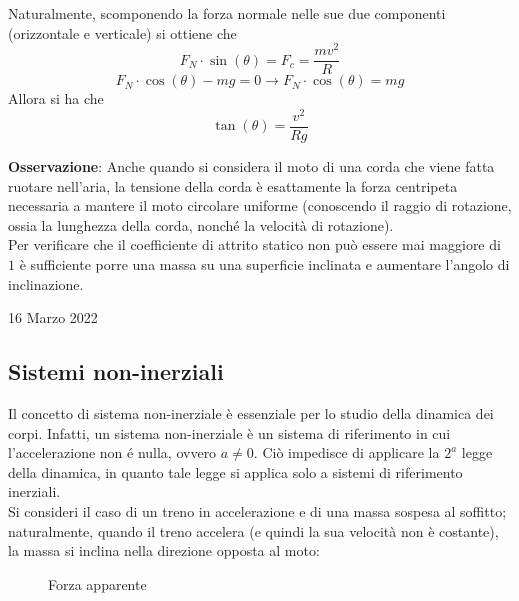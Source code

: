 \documentclass[a4paper]{extarticle}
\begin{document}
\vspace{1em}
\noindent
Naturalmente, scomponendo la forza normale nelle sue due componenti (orizzontale e verticale) si ottiene che
\[F_N \cdot \sin(\theta) = F_c = \frac{m v^2}{R}\]
\[F_N \cdot \cos(\theta) - mg = 0 \longrightarrow F_N \cdot \cos(\theta) = mg\]
Allora si ha che
\[\tan(\theta) = \frac{v^2}{R g}\]

\vspace{1em}
\noindent
\textbf{Osservazione}: Anche quando si considera il moto di una corda che viene fatta ruotare nell'aria, la tensione della corda è esattamente la forza centripeta necessaria a mantere il moto circolare uniforme (conoscendo il raggio di rotazione, ossia la lunghezza della corda, nonché la velocità di rotazione).\\
Per verificare che il coefficiente di attrito statico non può essere mai maggiore di $1$ è sufficiente porre una massa su una superficie inclinata e aumentare l'angolo di inclinazione.\\

\newpage
\noindent
\begin{center}
  16 Marzo 2022
\end{center}
\subsection{Sistemi non-inerziali}
Il concetto di sistema non-inerziale è essenziale per lo studio della dinamica dei corpi. Infatti, un sistema non-inerziale è un sistema di riferimento in cui l'accelerazione non é nulla, ovvero $a \neq 0$. Ciò impedisce di applicare la $2^a$ legge della dinamica, in quanto tale legge si applica solo a sistemi di riferimento inerziali.\\
Si consideri il caso di un treno in accelerazione e di una massa sospesa al soffitto; naturalmente, quando il treno accelera (e quindi la sua velocità non è costante), la massa si inclina nella direzione opposta al moto:

\begin{figure}[H]
  \centering
  \caption{Forza apparente}
  \label{fig:forza_apparente}
\end{figure}
\end{document}
